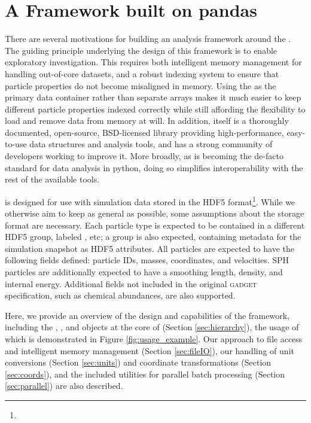 \section{A Framework built on pandas}
\label{sec:framework}

There are several motivations for building an analysis framework around the . 
The guiding principle underlying the design of this framework is to enable exploratory investigation.
This requires both intelligent memory management for handling out-of-core datasets, and a robust indexing system to ensure that particle properties do not become misaligned in memory.
Using  the  as the primary data container rather than separate  arrays makes it much easier to keep different particle properties indexed correctly while still affording the flexibility to load and remove data from memory at will.
In addition,  itself is a thoroughly documented, open-source, BSD-licensed library providing high-performance, easy-to-use data structures and analysis tools, and has a strong community of developers working to improve it.  
More broadly, as  is becoming the de-facto standard for data analysis in python, doing so simplifies interoperability with the rest of the available tools.

 is designed for use with simulation data stored in the HDF5 format\footnote{}.
While we otherwise aim to keep  as general as possible, some assumptions about the storage format are necessary.
Each particle type is expected to be contained in a different HDF5 group, labeled , etc; a  group is also expected, containing metadata for the simulation snapshot as HDF5 attributes. 
All particles are expected to have the following fields defined: particle IDs, masses, coordinates, and velocities.  
SPH particles are additionally expected to have a smoothing length, density, and internal energy.  Additional fields not included in the original \textsc{gadget} specification, such as chemical abundances, are also supported.

Here, we provide an overview of the design and capabilities of the  framework, including the , , and  objects at the core of  (Section \ref{sec:hierarchy}), the usage of which is demonstrated in Figure \ref{fig:usage_example}.
Our approach to file access and intelligent memory management (Section \ref{sec:fileIO}), our handling of unit conversions (Section \ref{sec:units}) and coordinate transformations (Section \ref{sec:coords}), and the included utilities for parallel batch processing (Section \ref{sec:parallel}) are also described.
